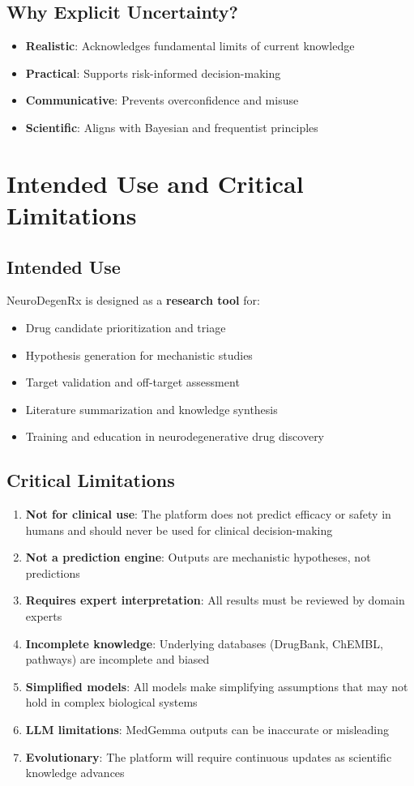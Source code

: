 \documentclass[12pt,a4paper]{article}
\begin{document}
\subsection{Why Explicit Uncertainty?}
\begin{itemize}
  \item \textbf{Realistic}: Acknowledges fundamental limits of current knowledge
  \item \textbf{Practical}: Supports risk-informed decision-making
  \item \textbf{Communicative}: Prevents overconfidence and misuse
  \item \textbf{Scientific}: Aligns with Bayesian and frequentist principles
\end{itemize}

\section{Intended Use and Critical Limitations}
\label{sec:limitations}

\subsection{Intended Use}
NeuroDegenRx is designed as a \textbf{research tool} for:
\begin{itemize}
  \item Drug candidate prioritization and triage
  \item Hypothesis generation for mechanistic studies
  \item Target validation and off-target assessment
  \item Literature summarization and knowledge synthesis
  \item Training and education in neurodegenerative drug discovery
\end{itemize}

\subsection{Critical Limitations}
\begin{enumerate}
  \item \textbf{Not for clinical use}: The platform does not predict efficacy or safety in humans and should never be used for clinical decision-making
  \item \textbf{Not a prediction engine}: Outputs are mechanistic hypotheses, not predictions
  \item \textbf{Requires expert interpretation}: All results must be reviewed by domain experts
  \item \textbf{Incomplete knowledge}: Underlying databases (DrugBank, ChEMBL, pathways) are incomplete and biased
  \item \textbf{Simplified models}: All models make simplifying assumptions that may not hold in complex biological systems
  \item \textbf{LLM limitations}: MedGemma outputs can be inaccurate or misleading
  \item \textbf{Evolutionary}: The platform will require continuous updates as scientific knowledge advances
\end{enumerate}
\end{document}
